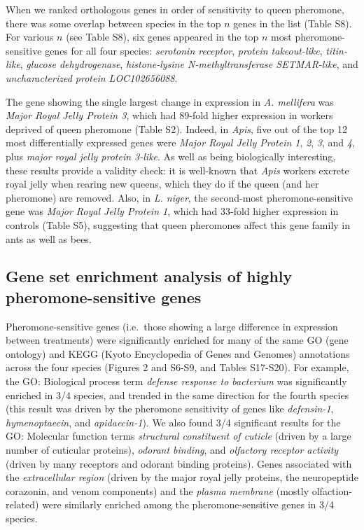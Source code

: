 \documentclass[12pt,]{article}
\begin{document}
When we ranked orthologous genes in order of sensitivity to queen
pheromone, there was some overlap between species in the top \(n\) genes
in the list (Table S8). For various \(n\) (see Table S8), six genes
appeared in the top \(n\) most pheromone-sensitive genes for all four
species: \emph{serotonin receptor}, \emph{protein takeout-like},
\emph{titin-like}, \emph{glucose dehydrogenase}, \emph{histone-lysine
N-methyltransferase SETMAR-like}, and \emph{uncharacterized protein
LOC102656088}.

The gene showing the single largest change in expression in \emph{A.
mellifera} was \emph{Major Royal Jelly Protein 3}, which had 89-fold
higher expression in workers deprived of queen pheromone (Table S2).
Indeed, in \emph{Apis}, five out of the top 12 most differentially
expressed genes were \emph{Major Royal Jelly Protein 1}, \emph{2},
\emph{3}, and \emph{4}, plus \emph{major royal jelly protein 3-like}. As
well as being biologically interesting, these results provide a validity
check: it is well-known that \emph{Apis} workers excrete royal jelly
when rearing new queens, which they do if the queen (and her pheromone)
are removed. Also, in \emph{L. niger}, the second-most
pheromone-sensitive gene was \emph{Major Royal Jelly Protein 1}, which
had 33-fold higher expression in controls (Table S5), suggesting that
queen pheromones affect this gene family in ants as well as bees.

\subsection{Gene set enrichment analysis of highly pheromone-sensitive
genes}\label{gene-set-enrichment-analysis-of-highly-pheromone-sensitive-genes}

Pheromone-sensitive genes (i.e.~those showing a large difference in
expression between treatments) were significantly enriched for many of
the same GO (gene ontology) and KEGG (Kyoto Encyclopedia of Genes and
Genomes) annotations across the four species (Figures 2 and S6-S9, and
Tables S17-S20). For example, the GO: Biological process term
\emph{defense response to bacterium} was significantly enriched in 3/4
species, and trended in the same direction for the fourth species (this
result was driven by the pheromone sensitivity of genes like
\emph{defensin-1}, \emph{hymenoptaecin}, and \emph{apidaecin-1}). We
also found 3/4 significant results for the GO: Molecular function terms
\emph{structural constituent of cuticle} (driven by a large number of
cuticular proteins), \emph{odorant binding}, and \emph{olfactory
receptor activity} (driven by many receptors and odorant binding
proteins). Genes associated with the \emph{extracellular region} (driven
by the major royal jelly proteins, the neuropeptide corazonin, and venom
components) and the \emph{plasma membrane} (mostly olfaction-related)
were similarly enriched among the pheromone-sensitive genes in 3/4
species.
\end{document}
